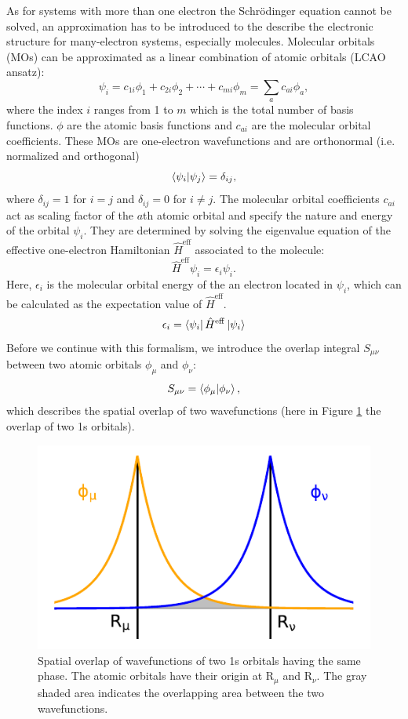 As for systems with more than one electron the Schr\"odinger equation cannot be solved, an approximation has to be introduced to the describe the electronic structure for many-electron systems, especially molecules. Molecular orbitals (MOs) can be approximated as a linear combination of atomic orbitals (LCAO ansatz):
\begin{equation}
    \psi_{i} = c_{1i}\phi_{1} + c_{2i}\phi_{2} + \cdots + c_{mi}\phi_{m} = \sum_{a}c_{ai}\phi_{a},  
    \label{eq:LCAO_ansatz}
\end{equation}
where the index $i$ ranges from 1 to $m$ which is the total number of basis functions. $\phi$ are the atomic basis functions and $c_{ai}$ are the molecular orbital coefficients. These MOs are one-electron wavefunctions and are orthonormal (i.e. normalized and orthogonal)
\begin{equation}
    \braket{\psi_{i}|\psi_{j}} = \delta_{ij},
    \label{eq:orthonormality}
\end{equation}
where $\delta_{ij} = 1$ for $i = j$ and $\delta_{ij} = 0$ for $i \neq j$. The molecular orbital coefficients $c_{ai}$ act as scaling factor of the $a$th atomic orbital and specify the nature and energy of the orbital $\psi_{i}$. They are determined by solving the eigenvalue equation of the effective one-electron Hamiltonian $\hat{H}^{\mathrm{eff}}$ associated to the molecule:
\begin{equation}
    \hat{H}^{\mathrm{eff}}\psi_{i} = \epsilon_{i}\psi_{i}.
    \label{eq:one_electron_Hamiltonian}
\end{equation}
Here, $\epsilon_{i}$ is the molecular orbital energy of the an electron located in $\psi_{i}$, which can be calculated as the expectation value of $\hat{H}^{\mathrm{eff}}$.
\begin{equation}
    \epsilon_{i} = \bra{\psi_{i}}\hat{H}^{\mathrm{eff}}\ket{\psi_{i}}
    \label{eq:MO_energy}
\end{equation}
Before we continue with this formalism, we introduce the overlap integral $S_{\mu \nu}$ between two atomic orbitals $\phi_{\mu}$ and $\phi_{\nu}$:
\begin{equation}
    S_{\mu \nu} = \braket{\phi_{\mu}|\phi_{\nu}},
    \label{eq:overlap_integral}
\end{equation}
which describes the spatial overlap of two wavefunctions (here in Figure \ref{fig:overlap_integral} the overlap of two 1s orbitals).
\begin{figure}[H]
    \centering
    \includegraphics[width=0.5\linewidth]{Figures/Overlap_integral.pdf}
    \caption{Spatial overlap of wavefunctions of two 1s orbitals having the same phase. The atomic orbitals have their origin at R$_{\mu}$ and R$_{\nu}$. The gray shaded area indicates the overlapping area between the two wavefunctions.}
    \label{fig:overlap_integral}
\end{figure}
